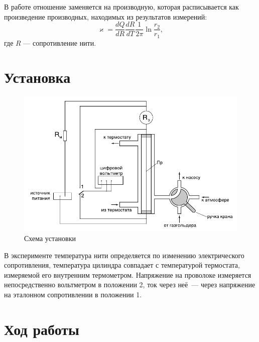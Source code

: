 \documentclass[12pt]{article}
\begin{document}
	В работе отношение заменяется на производную, которая расписывается как произведение производных, находимых из результатов измерений:
	\begin{equation}
		\label{eq:k_heat_work}
		\varkappa = \frac{dQ}{dR} \frac{dR}{dT} \frac{1}{2\pi} \ln \frac{r_2}{r_1},
	\end{equation}
	где $R$ --- сопротивление нити.
	
	\section*{Установка}
	
	\begin{figure}[h!]
	\caption{Схема установки}
	\label{fig:scheme}
	\begin{center}
	\includegraphics[scale=.6]{scheme.png}
	\end{center}
	\end{figure}
	
	В эксперименте температура нити определяется по изменению электрического сопротивления, температура цилиндра совпадает с температурой термостата, измеряемой его внутренним термометром. Напряжение на проволоке измеряется непосредственно вольтметром в положении 2, ток через неё~--- через напряжение на эталонном сопротивлении в положении 1.
	
	\section*{Ход работы}
	
\end{document}
